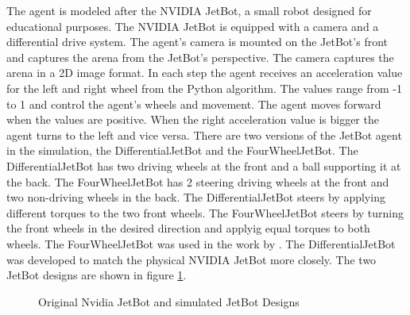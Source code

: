 The agent is modeled after the NVIDIA JetBot, a small robot designed for educational purposes. The NVIDIA JetBot is equipped with a camera and a differential drive system. The agent's camera is mounted on the JetBot's front and captures the arena from the JetBot's perspective. The camera captures the arena in a 2D image format. In each step the agent receives an acceleration value for the left and right wheel from the Python algorithm. The values range from -1 to 1 and control the agent's wheels and movement. The agent moves forward when the values are positive. When the right acceleration value is bigger the agent turns to the left and vice versa.
There are two versions of the JetBot agent in the simulation, the DifferentialJetBot and the FourWheelJetBot. The DifferentialJetBot has two driving wheels at the front and a ball supporting it at the back. The FourWheelJetBot has 2 steering driving wheels at the front and two non-driving wheels in the back. The DifferentialJetBot steers by applying different torques to the two front wheels. The FourWheelJetBot steers by turning the front wheels in the desired direction and applyig equal torques to both wheels.
The FourWheelJetBot was used in the work by \autocite{maximilian}. The DifferentialJetBot was developed to match the physical NVIDIA JetBot more closely. The two JetBot designs are shown in figure \ref{fig:jetbots}.


\begin{figure}
    \centering
    \qquad
    \qquad
    \qquad
    \caption{Original Nvidia JetBot and simulated JetBot Designs}
    \label{fig:jetbots}
\end{figure} %


